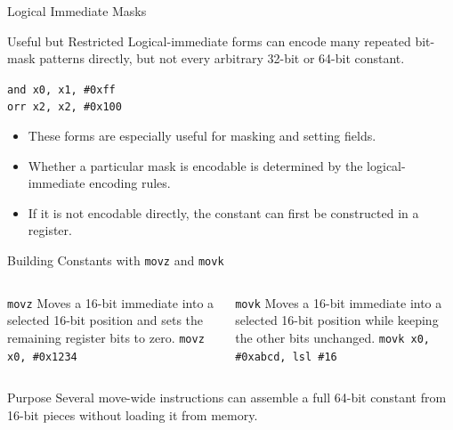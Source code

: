 \documentclass[aspectratio=169,11pt,t]{beamer}
\newcommand{\code}[1]{\texttt{#1}}
\begin{document}
\begin{frame}{Logical Immediate Masks}
\begin{block}{Useful but Restricted}
Logical-immediate forms can encode many repeated bit-mask patterns directly, but not every arbitrary 32-bit or 64-bit constant.
\end{block}
\vspace{0.2cm}
\large
\hspace{2.7cm}\code{and x0, x1, \#0xff}\\[0.14cm]
\hspace{2.7cm}\code{orr x2, x2, \#0x100}
\normalsize
\vspace{0.25cm}
\begin{itemize}
\item These forms are especially useful for masking and setting fields.
\item Whether a particular mask is encodable is determined by the logical-immediate encoding rules.
\item If it is not encodable directly, the constant can first be constructed in a register.
\end{itemize}
\end{frame}




\begin{frame}{Building Constants with \code{movz} and \code{movk}}
\begin{columns}[T,onlytextwidth]
\begin{block}{\code{movz}}
Moves a 16-bit immediate into a selected 16-bit position and sets the remaining register bits to zero.
\vspace{0.15cm}
\large
\hspace{0.8cm}\code{movz x0, \#0x1234}
\normalsize
\end{block}
\begin{block}{\code{movk}}
Moves a 16-bit immediate into a selected 16-bit position while keeping the other bits unchanged.
\vspace{0.15cm}
\large
\hspace{0.65cm}\code{movk x0, \#0xabcd, lsl \#16}
\normalsize
\end{block}
\end{columns}
\vspace{0.2cm}
\begin{block}{Purpose}
Several move-wide instructions can assemble a full 64-bit constant from 16-bit pieces without loading it from memory.
\end{block}
\end{frame}
\end{document}
